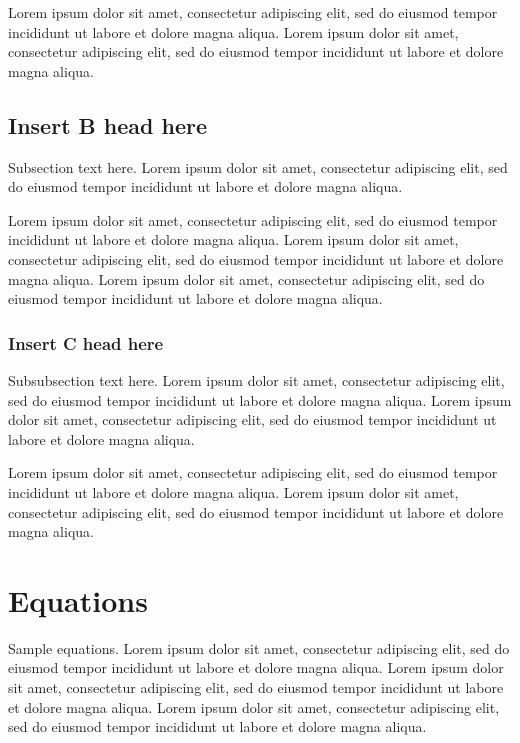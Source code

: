 \documentclass[
  journal=small,
  manuscript=article-type,  %
  year=2020,
  volume=37,
]{cup-journal}
\begin{document}
Lorem ipsum dolor sit amet, consectetur adipiscing elit, sed do eiusmod tempor incididunt ut labore et dolore magna aliqua. Lorem ipsum dolor sit amet, consectetur adipiscing elit, sed do eiusmod tempor incididunt ut labore et dolore magna aliqua. 


\subsection{Insert B head here}
Subsection text here. Lorem ipsum\autocite{Bayer_etal_2013} dolor sit amet, consectetur adipiscing elit, sed do eiusmod tempor incididunt ut labore\autocite{Adade_etal_2007} et dolore magna aliqua. 

 Lorem ipsum dolor sit amet, consectetur adipiscing elit, sed do eiusmod tempor incididunt ut labore et dolore magna aliqua. Lorem ipsum dolor sit amet, consectetur adipiscing elit, sed do eiusmod tempor incididunt ut labore et dolore magna aliqua. Lorem ipsum dolor sit amet, consectetur adipiscing elit, sed do eiusmod tempor incididunt ut labore et dolore magna aliqua. 

\subsubsection{Insert C head here}
Subsubsection text here. Lorem ipsum dolor sit amet, consectetur adipiscing elit, sed do eiusmod tempor incididunt ut labore et dolore magna aliqua. 
Lorem ipsum dolor sit amet, consectetur adipiscing elit, sed do eiusmod tempor incididunt ut labore et dolore magna aliqua. 

Lorem ipsum dolor sit amet, consectetur adipiscing elit, sed do eiusmod tempor incididunt ut labore et dolore magna aliqua. Lorem ipsum dolor sit amet, consectetur adipiscing elit, sed do eiusmod tempor incididunt ut labore et dolore magna aliqua. 

\section{Equations}

Sample equations. Lorem ipsum dolor sit amet, consectetur adipiscing elit, sed do eiusmod tempor incididunt ut labore et dolore magna aliqua. Lorem ipsum dolor sit amet, consectetur adipiscing elit, sed do eiusmod tempor incididunt ut labore et dolore magna aliqua. Lorem ipsum dolor sit amet, consectetur adipiscing elit, sed do eiusmod tempor incididunt ut labore et dolore magna aliqua. 
\end{document}
